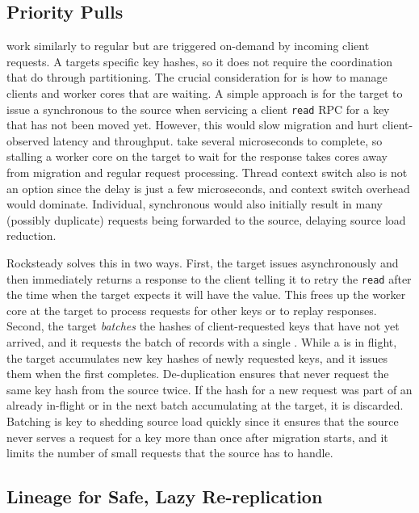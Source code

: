 \subsection{Priority Pulls}
\label{sec:priopulls}

\priopulls work similarly to regular \pulls but are triggered on-demand by
incoming client requests. A \priopull targets specific key hashes, so it
does not require the coordination that \pulls do through partitioning.
The crucial consideration for \priopulls is how to manage clients and worker
cores that are waiting. A simple approach is for the target to issue a
synchronous \priopull to
the source when servicing a client \texttt{read} RPC for a key that has
not been
moved yet. However, this would slow migration and hurt client-observed latency
and throughput. \priopulls take several microseconds to complete, so stalling a
worker core on the target to wait for the response takes cores away from
migration and regular request processing. Thread context switch also is not an
option since the delay is just a few microseconds, and context switch overhead
would dominate.  Individual, synchronous \priopulls would also initially result
in many (possibly duplicate) requests being forwarded to the source, delaying
source load reduction.

Rocksteady solves this in two ways. First, the target issues \priopulls
asynchronously and then immediately returns a response to the client telling it to
retry the \texttt{read} after the time when the target expects it will have the
value. This frees up the worker core at the target to process requests for
other keys or to replay \pull responses. Second, the target {\em batches} the
hashes of client-requested keys that have not yet arrived, and it
requests the batch of records with a single \priopull. While a
\priopull is in flight, the target accumulates new key hashes of newly
requested keys, and it issues them when the first \priopull completes.
De-duplication ensures that \priopulls never request the same key hash
from the source twice. If the hash for a new request was part of an already in-flight \priopull
or in the next batch accumulating at the target, it is
discarded.  Batching is key to shedding source load quickly since it ensures
that the source never serves a request for a key more than once after migration
starts, and it limits the number of small requests that the source has to
handle.

\subsection{Lineage for Safe, Lazy Re-replication}
\label{sec:log-dep}

